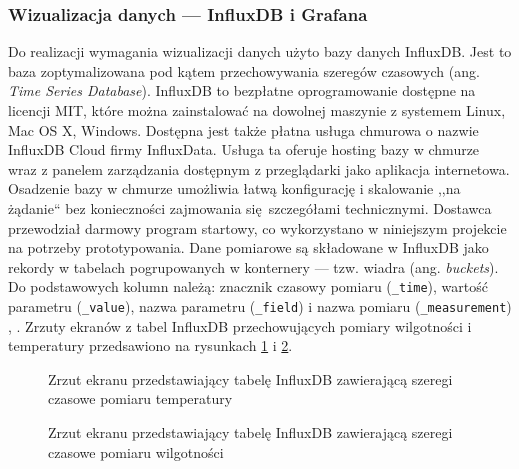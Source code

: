 \documentclass[a4paper, 12pt, twoside]{article}
\begin{document}
\subsubsection{Wizualizacja danych --- InfluxDB i Grafana}

Do realizacji wymagania wizualizacji danych użyto bazy danych InfluxDB.
Jest to baza zoptymalizowana pod kątem przechowywania szeregów czasowych
(ang. \emph{Time Series Database}). InfluxDB to bezpłatne
oprogramowanie dostępne na licencji MIT, które można zainstalować na dowolnej
maszynie z systemem Linux, Mac OS X, Windows. Dostępna jest także
płatna usługa chmurowa o nazwie InfluxDB Cloud firmy InfluxData. Usługa ta oferuje hosting
bazy w chmurze wraz z panelem zarządzania dostępnym z przeglądarki jako 
aplikacja internetowa. Osadzenie bazy w chmurze umożliwia łatwą konfigurację
i skalowanie ,,na żądanie`` bez konieczności zajmowania się szczegółami technicznymi. 
Dostawca przewodział darmowy program startowy, co wykorzystano w niniejszym projekcie
na potrzeby prototypowania. Dane pomiarowe są składowane w InfluxDB
jako rekordy w tabelach pogrupowanych w konternery --- tzw. wiadra (ang. \emph{buckets}).
Do podstawowych kolumn należą: znacznik czasowy pomiaru (\texttt{\_time}),
wartość parametru (\texttt{\_value}), nazwa parametru (\texttt{\_field}) i nazwa pomiaru (\texttt{\_measurement})
\cite{influx-db-cloud}, \cite{influx-db}.
Zrzuty ekranów z tabel InfluxDB przechowujących pomiary wilgotności i temperatury
przedsawiono na rysunkach \ref{fig:influx_1} i \ref{fig:influx_2}.

\begin{figure}[h]
      \centering
      \caption{Zrzut ekranu przedstawiający tabelę InfluxDB zawierającą szeregi czasowe pomiaru temperatury}
      \label{fig:influx_1}
\end{figure}

\begin{figure}[h]
      \centering
      \caption{Zrzut ekranu przedstawiający tabelę InfluxDB zawierającą szeregi czasowe pomiaru wilgotności}
      \label{fig:influx_2}
\end{figure}
\end{document}
